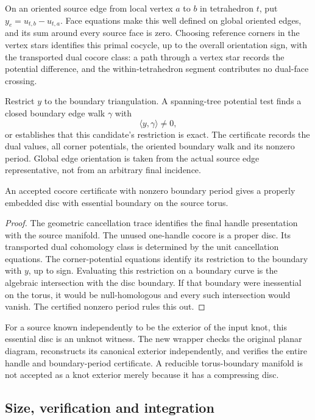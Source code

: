 On an oriented source edge from local vertex $a$ to $b$ in tetrahedron $t$,
put $y_e=u_{t,b}-u_{t,a}$. Face equations make this well defined on global
oriented edges, and its sum around every source face is zero. Choosing
reference corners in the vertex stars identifies this primal cocycle,
up to the overall orientation sign, with the transported dual cocore class:
a path through a vertex star records the potential difference, and the
within-tetrahedron segment contributes no dual-face crossing.

Restrict $y$ to the boundary triangulation. A spanning-tree potential test
finds a closed boundary edge walk $\gamma$ with
\[
 \langle y,\gamma\rangle\ne0,
\]
or establishes that this candidate's restriction is exact. The certificate
records the dual values, all corner potentials, the oriented boundary walk
and its nonzero period. Global edge orientation is taken from the actual
source edge representative, not from an arbitrary final incidence.

\begin{proposition}
An accepted cocore certificate with nonzero boundary period gives a properly
embedded disc with essential boundary on the source torus.
\end{proposition}
\begin{proof}
The geometric cancellation trace identifies the final handle presentation
with the source manifold. The unused one-handle cocore is a proper disc.
Its transported dual cohomology class is determined by the unit cancellation
equations. The corner-potential equations identify its restriction to the
boundary with $y$, up to sign. Evaluating this restriction on a boundary
curve is the algebraic intersection with the disc boundary. If that boundary
were inessential on the torus, it would be null-homologous and every such
intersection would vanish. The certified nonzero period rules this out.
\end{proof}

For a source known independently to be the exterior of the input knot, this
essential disc is an unknot witness. The new
 wrapper checks the original planar diagram,
reconstructs its canonical exterior independently, and verifies the entire
handle and boundary-period certificate. A reducible torus-boundary manifold
is not accepted as a knot exterior merely because it has a compressing disc.

\subsection{Size, verification and integration}

